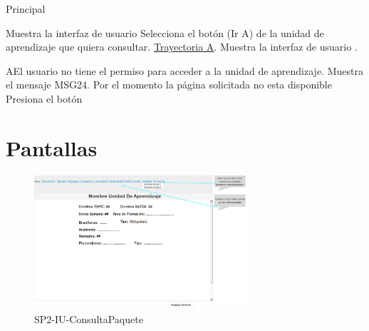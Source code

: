 \begin{UCtrayectoria}{Principal}


    \UCpaso Muestra la interfaz de usuario  %
    \UCpaso [\UCactor] Selecciona el botón \IUbutton {->} (Ir A) de la unidad de aprendizaje que quiera consultar. \hyperref[SP2-CU1-A]{Trayectoria A}.
    \UCpaso  Muestra la interfaz de usuario .

\end{UCtrayectoria}


\label{SP2-CU1-A}
\begin{UCtrayectoriaA}{A}{El usuario no tiene el permiso para acceder a la unidad de aprendizaje.}
    \UCpaso Muestra el mensaje MSG24. Por el momento la página solicitada no esta disponible
    \UCpaso[\UCactor] Presiona el botón 
\end{UCtrayectoriaA}

\chapter{Pantallas}
 \begin{figure}
  \centering
    \includegraphics[width=0.7\textwidth]{DCU/SP2/Pantallas/Inicio}
  \caption{SP2-IU-ConsultaPaquete}
  \label{SP2-IU-ConsultaPaquete}
\end{figure}



